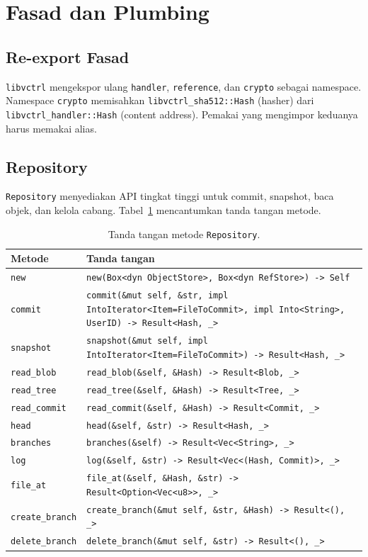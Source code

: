 \documentclass[11pt,a4paper]{article}
\begin{document}
\section{Fasad dan Plumbing}

\subsection{Re-export Fasad}

\texttt{libvctrl} mengekspor ulang \texttt{handler}, \texttt{reference}, dan \texttt{crypto} sebagai namespace. Namespace \texttt{crypto} memisahkan \texttt{libvctrl\_sha512::Hash} (hasher) dari \texttt{libvctrl\_handler::Hash} (content address). Pemakai yang mengimpor keduanya harus memakai alias.

\subsection{Repository}

\texttt{Repository} menyediakan API tingkat tinggi untuk commit, snapshot, baca objek, dan kelola cabang. Tabel~\ref{tab:repository} mencantumkan tanda tangan metode.

\begin{table}[H]
	\centering
	\caption{Tanda tangan metode \texttt{Repository}.}
	\label{tab:repository}
	\footnotesize
	\begin{tabularx}{\textwidth}{l X}
		\toprule
		Metode & Tanda tangan \\
		\midrule
		\texttt{new} & \texttt{new(Box<dyn ObjectStore>, Box<dyn RefStore>) -> Self} \\
		\texttt{commit} & \texttt{commit(\&mut self, \&str, impl IntoIterator<Item=FileToCommit>, impl Into<String>, UserID) -> Result<Hash, \_>} \\
		\texttt{snapshot} & \texttt{snapshot(\&mut self, impl IntoIterator<Item=FileToCommit>) -> Result<Hash, \_>} \\
		\texttt{read\_blob} & \texttt{read\_blob(\&self, \&Hash) -> Result<Blob, \_>} \\
		\texttt{read\_tree} & \texttt{read\_tree(\&self, \&Hash) -> Result<Tree, \_>} \\
		\texttt{read\_commit} & \texttt{read\_commit(\&self, \&Hash) -> Result<Commit, \_>} \\
		\texttt{head} & \texttt{head(\&self, \&str) -> Result<Hash, \_>} \\
		\texttt{branches} & \texttt{branches(\&self) -> Result<Vec<String>, \_>} \\
		\texttt{log} & \texttt{log(\&self, \&str) -> Result<Vec<(Hash, Commit)>, \_>} \\
		\texttt{file\_at} & \texttt{file\_at(\&self, \&Hash, \&str) -> Result<Option<Vec<u8>>, \_>} \\
		\texttt{create\_branch} & \texttt{create\_branch(\&mut self, \&str, \&Hash) -> Result<(), \_>} \\
		\texttt{delete\_branch} & \texttt{delete\_branch(\&mut self, \&str) -> Result<(), \_>} \\
		\bottomrule
	\end{tabularx}
\end{table}
\end{document}
